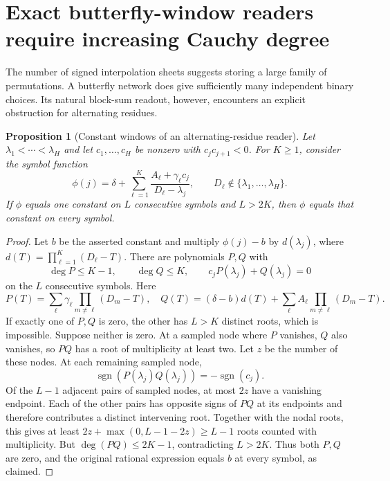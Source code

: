 \documentclass[11pt]{article}
\newtheorem{proposition}{Proposition}
\begin{document}
\section{Exact butterfly-window readers require increasing Cauchy degree}
The number of signed interpolation sheets suggests storing a large family
of permutations. A butterfly network does give sufficiently many
independent binary choices. Its natural block-sum readout, however,
encounters an explicit obstruction for alternating residues.

\begin{proposition}[Constant windows of an alternating-residue reader]
Let $\lambda_1<\cdots<\lambda_H$ and let $c_1,\ldots,c_H$ be nonzero
with $c_jc_{j+1}<0$. For $K\geq1$, consider the symbol function
\[
 \phi(j)=\delta+\sum_{\ell=1}^K
 \frac{A_\ell+\gamma_\ell c_j}{D_\ell-\lambda_j},
 \qquad D_\ell\notin\{\lambda_1,\ldots,\lambda_H\}.
\]
If $\phi$ equals one constant on $L$ consecutive symbols and $L>2K$,
then $\phi$ equals that constant on every symbol.
\end{proposition}
\begin{proof}
Let $b$ be the asserted constant and multiply $\phi(j)-b$ by
$d(\lambda_j)$, where $d(T)=\prod_{\ell=1}^K(D_\ell-T)$.
There are polynomials $P,Q$ with
\[
 \deg P\leq K-1,\qquad \deg Q\leq K,
 \qquad c_jP(\lambda_j)+Q(\lambda_j)=0
\]
on the $L$ consecutive symbols. Here
\[
 P(T)=\sum_\ell\gamma_\ell\prod_{m\ne\ell}(D_m-T),
 \quad Q(T)=(\delta-b)d(T)
       +\sum_\ell A_\ell\prod_{m\ne\ell}(D_m-T).
\]
If exactly one of $P,Q$ is zero, the other has $L>K$ distinct roots,
which is impossible. Suppose neither is zero. At a sampled node where
$P$ vanishes, $Q$ also vanishes, so $PQ$ has a root of multiplicity at
least two. Let $z$ be the number of these nodes. At each remaining
sampled node,
\[
 \operatorname{sgn}(P(\lambda_j)Q(\lambda_j))
   =-\operatorname{sgn}(c_j).
\]
Of the $L-1$ adjacent pairs of sampled nodes, at most $2z$ have a
vanishing endpoint. Each of the other pairs has opposite signs of
$PQ$ at its endpoints and therefore contributes a distinct intervening
root. Together with the nodal roots, this gives at least
$2z+\max(0,L-1-2z)\geq L-1$ roots counted with multiplicity.
But $\deg(PQ)\leq2K-1$, contradicting $L>2K$.
Thus both $P,Q$ are zero, and the original rational expression equals
$b$ at every symbol, as claimed.
\end{proof}
\end{document}
